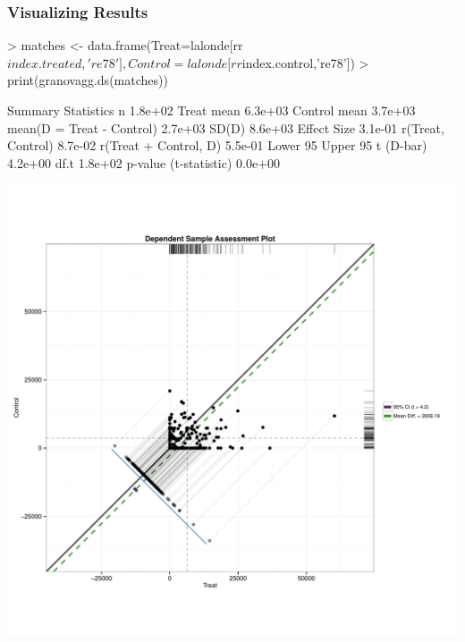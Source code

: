 \documentclass[10pt,slidestop,mathserif,c]{beamer}
\begin{document}
\begin{frame}
    \frametitle{Visualizing Results}
\begin{Schunk}
\begin{Sinput}
> matches <- data.frame(Treat=lalonde[rr$index.treated,'re78'], 
   Control=lalonde[rr$index.control,'re78'])
> print(granovagg.ds(matches))
\end{Sinput}
\begin{Soutput}
                              Summary Statistics
n                                        1.8e+02
Treat mean                               6.3e+03
Control mean                             3.7e+03
mean(D = Treat - Control)                2.7e+03
SD(D)                                    8.6e+03
Effect Size                              3.1e-01
r(Treat, Control)                        8.7e-02
r(Treat + Control, D)                    5.5e-01
Lower 95%
Upper 95%
t (D-bar)                                4.2e+00
df.t                                     1.8e+02
p-value (t-statistic)                    0.0e+00
\end{Soutput}
\end{Schunk}
\end{frame}

\begin{frame}
    \begin{center}
        \includegraphics{figures/Slides-granovaggds}
    \end{center}
\end{frame}
\end{document}
